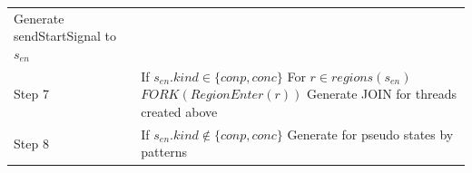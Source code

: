 \begin{table}[]
\begin{tabular}{p{1cm}p{7cm}}
					\-\hspace{0.2cm}   {Generate sendStartSignal to $s_{en}$}                     \\
			Step 7 & If $s_{en}.kind\in\{conp,conc\}$ \newline
					\-\hspace{0.2cm} For {$ r \in regions(s_{en})$} \newline
					\-\hspace{0.4cm} {$FORK(RegionEnter(r))$}    \newline
					\-\hspace{0.2cm} {Generate JOIN for threads created above}                      \\
			Step 8 & If $s_{en}.kind\notin\{conp,conc\}$ \newline
					\-\hspace{0.2cm}  {Generate for pseudo states by patterns}  \\
			\hline
			                                                 
		\end{tabular}
	\end{table}



